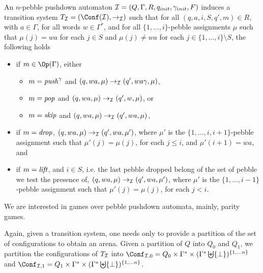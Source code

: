 \begin{samepage}
An $n$-pebble pushdown automaton $\mathcal{I} =  (Q, \Gamma,  R, q_{init}, {\gamma_{init}} , F)$ induces 
a transition system  $T_{\ppda} = (\Conf(\ppda), \rightarrow_{\ppda})$ 
 such that
for all $(q, a, i, S, q', m) \in R$, with $a \in \Gamma$,
 for all words $w \in  \Gamma^*$, and for all $\{ 1, \ldots , i \}$-pebble assignments $\mu$ such that $\mu(j) = wa$ 
 for each
$j \in S$ 	and
 $\mu(j) \neq wa$ 
 for each $j \in \{ 1, \ldots , i \} \setminus S$,
the following holds
\begin{itemize}
\item if $m \in \Op(\Gamma)$, 
either
\begin{itemize}
\item $ m = \text{\textit{push}}^\gamma$ and $(q,wa,\mu) \rightarrow_{\mathcal{I}} (q',wa\gamma, \mu)$,

\item $ m = \text{\textit{pop}}$ and $(q,wa,\mu) \rightarrow_{\mathcal{I}} (q',w, \mu)$, or

\item $ m = \text{\textit{skip}}$ and $(q,wa,\mu) \rightarrow_{\mathcal{I}} (q',wa, \mu)$,
\end{itemize}
\item if $ m = \text{\textit{drop}}$, 
$(q,wa,\mu) \rightarrow_{\mathcal{I}} (q',wa, \mu')$,  
where $\mu'$ is the $\{ 1, \ldots , i, i+1 \}$-pebble assignment such that
$\mu'(j) = \mu(j)$, for each
$j \leq i$, and $\mu'(i+1) = wa$, and
\item if $m = \text{\textit{lift}}$, and $i \in S$, i.e. the last pebble dropped belong of the set of pebble we test the presence of,
$(q,wa,\mu) \rightarrow_{\mathcal{I}} (q',wa, \mu')$, 
where $\mu'$ is the $\{ 1, \ldots , i - 1 \}$-pebble assignment such that
$\mu'(j) = \mu(j)$, for each
$j < i$.
\end{itemize}
\end{samepage}


\par\noindent\ignorespacesafterend
We are interested in games over pebble pushdown automata, %
mainly, parity games.

Again, given
a 
 transition system, one needs only to provide 
a partition of the set of
configurations 
 to obtain an arena.
Given a partition of
$Q$ into $Q_0$ and $Q_1$, 
we partition the configurations of
$T_{\mathcal{I}}$
into
$\Conf_{\ppda,0}=Q_0\times \Gamma^* \times ( \Gamma^* \biguplus \{ \bot \})^{\{1, \ldots n\}}$
and
$\Conf_{\ppda,1}=Q_1\times  \Gamma^* \times ( \Gamma^* \biguplus \{ \bot \})^{\{1, \ldots n\}}$. 




